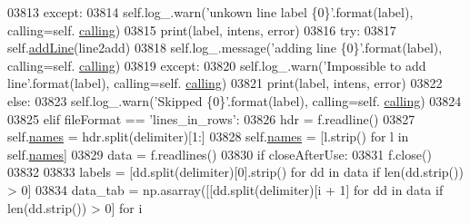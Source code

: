 \begin{DoxyCode}
03813                         \textcolor{keywordflow}{except}:
03814                             self.log\_.warn(\textcolor{stringliteral}{'unkown line label \{0\}'}.format(label), calling=self.
      \hyperlink{classpyneb_1_1core_1_1pynebcore_1_1_observation_a2639fad9af4fefad20e4097295bd40e7}{calling})
03815                             print(label, intens, error)
03816                         \textcolor{keywordflow}{try}:
03817                             self.\hyperlink{classpyneb_1_1core_1_1pynebcore_1_1_observation_a17ddf1c03fd1859cafe36d0593ec5f01}{addLine}(line2add)
03818                             self.log\_.message(\textcolor{stringliteral}{'adding line \{0\}'}.format(label), calling=self.
      \hyperlink{classpyneb_1_1core_1_1pynebcore_1_1_observation_a2639fad9af4fefad20e4097295bd40e7}{calling})
03819                         \textcolor{keywordflow}{except}:
03820                             self.log\_.warn(\textcolor{stringliteral}{'Impossible to add line'}.format(label), calling=self.
      \hyperlink{classpyneb_1_1core_1_1pynebcore_1_1_observation_a2639fad9af4fefad20e4097295bd40e7}{calling})
03821                             print(label, intens, error)
03822                     \textcolor{keywordflow}{else}:
03823                         self.log\_.warn(\textcolor{stringliteral}{'Skipped \{0\}'}.format(label), calling=self.
      \hyperlink{classpyneb_1_1core_1_1pynebcore_1_1_observation_a2639fad9af4fefad20e4097295bd40e7}{calling})
03824             
03825         \textcolor{keywordflow}{elif} fileFormat == \textcolor{stringliteral}{'lines\_in\_rows'}:
03826             hdr = f.readline()
03827             self.\hyperlink{classpyneb_1_1core_1_1pynebcore_1_1_observation_a3f365d0b1488b2eba300bf71caf23c17}{names} = hdr.split(delimiter)[1:]
03828             self.\hyperlink{classpyneb_1_1core_1_1pynebcore_1_1_observation_a3f365d0b1488b2eba300bf71caf23c17}{names} =  [l.strip() \textcolor{keywordflow}{for} l \textcolor{keywordflow}{in} self.\hyperlink{classpyneb_1_1core_1_1pynebcore_1_1_observation_a3f365d0b1488b2eba300bf71caf23c17}{names}]
03829             data = f.readlines()
03830             \textcolor{keywordflow}{if} closeAfterUse:
03831                 f.close()
03832 
03833             labels = [dd.split(delimiter)[0].strip() \textcolor{keywordflow}{for} dd \textcolor{keywordflow}{in} data \textcolor{keywordflow}{if} len(dd.strip()) > 0]
03834             data\_tab = np.asarray([[dd.split(delimiter)[i + 1] \textcolor{keywordflow}{for} dd \textcolor{keywordflow}{in} data \textcolor{keywordflow}{if} len(dd.strip()) > 0] \textcolor{keywordflow}{for} i

\end{DoxyCode}
